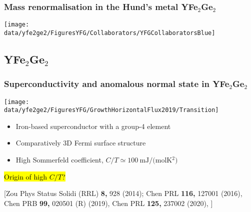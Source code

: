 
\begin{frame}[plain,label=YFGCollab]
\frametitle {Mass renormalisation in the Hund's metal YFe$_2$Ge$_2$}
\vspace{1em}
\texttt{[image: \\data/yfe2ge2/FiguresYFG/Collaborators/YFGCollaboratorsBlue]}
\end{frame}

\subsection{YFe$_2$Ge$_2$}
\begin{frame}[label=YFGIntro]
\frametitle{Superconductivity and anomalous normal state in YFe$_2$Ge$_2$}

\centerline{\texttt{[image: \\data/yfe2ge2/FiguresYFG/GrowthHorizontalFlux2019/Transition]} }
\begin{itemize}
\item
Iron-based superconductor with a group-4 element
\item
Comparatively 3D Fermi surface structure 
\item
High Sommerfeld coefficient, $C/T \simeq \SI{100}{\mJ/(\mol\kelvin^2)}$
\end{itemize}
\centerline{\hl{Origin of high $C/T$?}}

\vspace*{\fill}
\centerline{\makebox[\linewidth]{\rule{0.85\textwidth}{0.4pt}}}
\begin{center}
{\scriptsize [Zou Phys Status Solidi (RRL) {\bf 8,} 928
  (2014); Chen PRL {\bf 116,} 127001 (2016), Chen PRB {\bf 99,} 020501 (R) (2019), Chen PRL {\bf 125,} 237002 (2020), ]}
  \end{center}
\end{frame}





